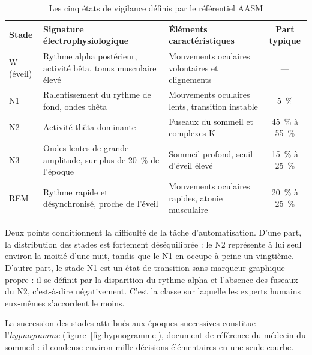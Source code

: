 \begin{table}[H]
\centering

\small
\begin{tabular}{@{}lL{4.6cm}L{5.4cm}c@{}}
\toprule
\textbf{Stade} & \textbf{Signature électrophysiologique} & \textbf{Éléments
caractéristiques} & \textbf{Part typique} \\
\midrule
W (éveil) & Rythme alpha postérieur, activité bêta, tonus musculaire élevé &
Mouvements oculaires volontaires et clignements & --- \\
\addlinespace[2pt]
N1 & Ralentissement du rythme de fond, ondes thêta & Mouvements oculaires lents,
transition instable & \SI{5}{\percent} \\
\addlinespace[2pt]
N2 & Activité thêta dominante & Fuseaux du sommeil et complexes K & \SI{45}{\percent}
à \SI{55}{\percent} \\
\addlinespace[2pt]
N3 & Ondes lentes de grande amplitude, sur plus de \SI{20}{\percent} de l'époque &
Sommeil profond, seuil d'éveil élevé & \SI{15}{\percent} à \SI{25}{\percent} \\
\addlinespace[2pt]
REM & Rythme rapide et désynchronisé, proche de l'éveil & Mouvements oculaires
rapides, atonie musculaire & \SI{20}{\percent} à \SI{25}{\percent} \\
\bottomrule
\end{tabular}
\caption{Les cinq états de vigilance définis par le référentiel AASM}
\label{tab:stades}
\end{table}

Deux points conditionnent la difficulté de la tâche d'automatisation. D'une part, la
distribution des stades est fortement déséquilibrée : le N2 représente à lui seul
environ la moitié d'une nuit, tandis que le N1 en occupe à peine un vingtième. D'autre
part, le stade N1 est un état de transition sans marqueur graphique propre : il se
définit par la disparition du rythme alpha et l'absence des fuseaux du N2, c'est-à-dire
négativement. C'est la classe sur laquelle les experts humains eux-mêmes s'accordent le
moins.

La succession des stades attribués aux époques successives constitue
l'\emph{hypnogramme} (figure~\ref{fig:hypnogramme}), document de référence du médecin
du sommeil : il condense environ mille décisions élémentaires en une seule courbe.

